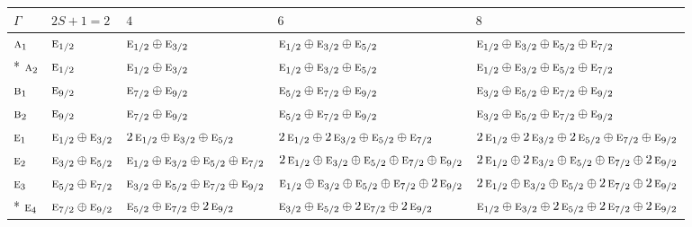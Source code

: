 \documentclass[10pt,a4paper]{article}
\numberwithin{equation}{section}
\newcommand{\irr}[1]{\text{\normalfont\scshape #1}}
\begin{document}
{\small\setlength{\tabcolsep}{3pt}\begin{longtable}{@{}l>{\RaggedRight\arraybackslash}p{}>{\RaggedRight\arraybackslash}p{}>{\RaggedRight\arraybackslash}p{}>{\RaggedRight\arraybackslash}p{}@{}}\toprule
$\Gamma$ & $2S + 1 = 2$ & $4$ & $6$ & $8$\\\midrule\endhead
\bottomrule\endfoot\endlastfoot
$\irr{a}_{1}$ & $\irr{e}_{1/2}$ & $\irr{e}_{1/2}\oplus \irr{e}_{3/2}$ & $\irr{e}_{1/2}\oplus \irr{e}_{3/2}\oplus \irr{e}_{5/2}$ & $\irr{e}_{1/2}\oplus \irr{e}_{3/2}\oplus \irr{e}_{5/2}\oplus \irr{e}_{7/2}$\\*
$\irr{a}_{2}$ & $\irr{e}_{1/2}$ & $\irr{e}_{1/2}\oplus \irr{e}_{3/2}$ & $\irr{e}_{1/2}\oplus \irr{e}_{3/2}\oplus \irr{e}_{5/2}$ & $\irr{e}_{1/2}\oplus \irr{e}_{3/2}\oplus \irr{e}_{5/2}\oplus \irr{e}_{7/2}$\\
$\irr{b}_{1}$ & $\irr{e}_{9/2}$ & $\irr{e}_{7/2}\oplus \irr{e}_{9/2}$ & $\irr{e}_{5/2}\oplus \irr{e}_{7/2}\oplus \irr{e}_{9/2}$ & $\irr{e}_{3/2}\oplus \irr{e}_{5/2}\oplus \irr{e}_{7/2}\oplus \irr{e}_{9/2}$\\
$\irr{b}_{2}$ & $\irr{e}_{9/2}$ & $\irr{e}_{7/2}\oplus \irr{e}_{9/2}$ & $\irr{e}_{5/2}\oplus \irr{e}_{7/2}\oplus \irr{e}_{9/2}$ & $\irr{e}_{3/2}\oplus \irr{e}_{5/2}\oplus \irr{e}_{7/2}\oplus \irr{e}_{9/2}$\\
$\irr{e}_{1}$ & $\irr{e}_{1/2}\oplus \irr{e}_{3/2}$ & $2\,\irr{e}_{1/2}\oplus \irr{e}_{3/2}\oplus \irr{e}_{5/2}$ & $2\,\irr{e}_{1/2}\oplus 2\,\irr{e}_{3/2}\oplus \irr{e}_{5/2}\oplus \irr{e}_{7/2}$ & $2\,\irr{e}_{1/2}\oplus 2\,\irr{e}_{3/2}\oplus 2\,\irr{e}_{5/2}\oplus \irr{e}_{7/2}\oplus \irr{e}_{9/2}$\\
$\irr{e}_{2}$ & $\irr{e}_{3/2}\oplus \irr{e}_{5/2}$ & $\irr{e}_{1/2}\oplus \irr{e}_{3/2}\oplus \irr{e}_{5/2}\oplus \irr{e}_{7/2}$ & $2\,\irr{e}_{1/2}\oplus \irr{e}_{3/2}\oplus \irr{e}_{5/2}\oplus \irr{e}_{7/2}\oplus \irr{e}_{9/2}$ & $2\,\irr{e}_{1/2}\oplus 2\,\irr{e}_{3/2}\oplus \irr{e}_{5/2}\oplus \irr{e}_{7/2}\oplus 2\,\irr{e}_{9/2}$\\
$\irr{e}_{3}$ & $\irr{e}_{5/2}\oplus \irr{e}_{7/2}$ & $\irr{e}_{3/2}\oplus \irr{e}_{5/2}\oplus \irr{e}_{7/2}\oplus \irr{e}_{9/2}$ & $\irr{e}_{1/2}\oplus \irr{e}_{3/2}\oplus \irr{e}_{5/2}\oplus \irr{e}_{7/2}\oplus 2\,\irr{e}_{9/2}$ & $2\,\irr{e}_{1/2}\oplus \irr{e}_{3/2}\oplus \irr{e}_{5/2}\oplus 2\,\irr{e}_{7/2}\oplus 2\,\irr{e}_{9/2}$\\*
$\irr{e}_{4}$ & $\irr{e}_{7/2}\oplus \irr{e}_{9/2}$ & $\irr{e}_{5/2}\oplus \irr{e}_{7/2}\oplus 2\,\irr{e}_{9/2}$ & $\irr{e}_{3/2}\oplus \irr{e}_{5/2}\oplus 2\,\irr{e}_{7/2}\oplus 2\,\irr{e}_{9/2}$ & $\irr{e}_{1/2}\oplus \irr{e}_{3/2}\oplus 2\,\irr{e}_{5/2}\oplus 2\,\irr{e}_{7/2}\oplus 2\,\irr{e}_{9/2}$\\
\bottomrule\end{longtable}}
\end{document}
